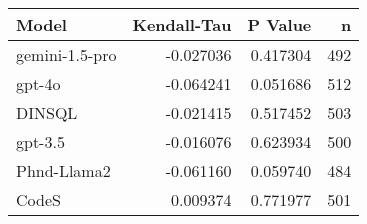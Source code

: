 \begin{tabular}{lrrr}
\toprule
Model & Kendall-Tau & P Value & n \\
\midrule
gemini-1.5-pro & -0.027036 & 0.417304 & 492 \\
gpt-4o & -0.064241 & 0.051686 & 512 \\
DINSQL & -0.021415 & 0.517452 & 503 \\
gpt-3.5 & -0.016076 & 0.623934 & 500 \\
Phnd-Llama2 & -0.061160 & 0.059740 & 484 \\
CodeS & 0.009374 & 0.771977 & 501 \\
\bottomrule
\end{tabular}

